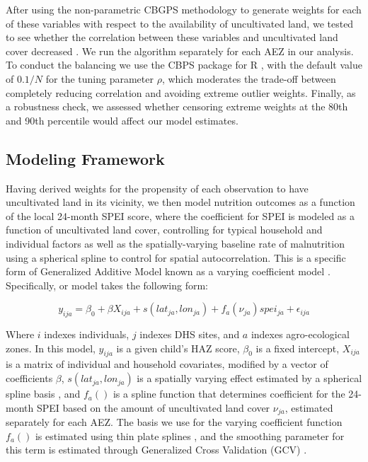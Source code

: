 \documentclass{article}
\begin{document}
After using the non-parametric CBGPS methodology to generate weights for each of these variables with respect to the availability of uncultivated land, we tested to see whether the correlation between these variables and uncultivated land cover decreased \cite{Fong2018}.  We run the algorithm separately for each AEZ in our analysis.  To conduct the balancing we use the CBPS package for R \cite{Fong2018a}, with the default value of $0.1/N$ for the tuning parameter $\rho$, which moderates the trade-off between completely reducing correlation and avoiding extreme outlier weights.  Finally, as a robustness check, we assessed whether censoring extreme weights at the 80th and 90th percentile would affect our model estimates.

\subsection{Modeling Framework}
Having derived weights for the propensity of each observation to have uncultivated land in its vicinity, we then model nutrition outcomes as a function of the local 24-month SPEI score, where the coefficient for SPEI is modeled as a function of uncultivated land cover, controlling for typical household and individual factors as well as the spatially-varying baseline rate of malnutrition using a spherical spline to control for spatial autocorrelation.  This is a specific form of Generalized Additive Model \cite{Hastie1986} known as a varying coefficient model \cite{Wood2017}.  Specifically, or model takes the following form:

\begin{equation}
  y_{ija} = \beta_0 + \beta X_{ija} + s(lat_{ja}, lon_{ja}) + f_{a}(\nu_{ja}) spei_{ja} + \epsilon_{ija} \label{eqn:GAM}
\end{equation}

Where $i$ indexes individuals, $j$ indexes DHS sites, and $a$ indexes agro-ecological zones. In this model, $y_{ija}$ is a given child's HAZ score, $\beta_0$ is a fixed intercept, $X_{ija}$ is a matrix of individual and household covariates, modified by a vector of coefficients $\beta$, $s(lat_{ja}, lon_{ja})$ is a spatially varying effect estimated by a spherical spline basis \cite{Wahba1982}, and $f_{a}()$ is a spline function that determines coefficient for the 24-month SPEI based on the amount of uncultivated land cover $\nu_{ja}$, estimated separately for each AEZ.  The basis we use for the varying coefficient function $f_{a}()$ is estimated using thin plate splines \cite{Duchon1977}, and the smoothing parameter for this term is estimated through Generalized Cross Validation (GCV) \cite{Wood2017}.
\end{document}
